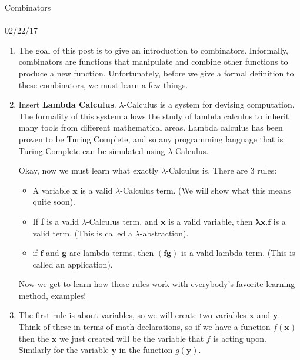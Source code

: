 \documentclass[12pt]{article}
\begin{document}
\begin{center}
{\Large Combinators}\\
\\ %
02/22/17 %
\end{center}

\begin{enumerate}
    \item The goal of this post is to give an introduction to combinators. Informally, combinators are functions that manipulate and combine other functions to produce a new function. Unfortunately, before we give a formal definition to these combinators, we must learn a few things.
    
    \item Insert \textbf{Lambda Calculus}. $\lambda$-Calculus is a system for devising computation. The formality of this system allows the study of lambda calculus to inherit many tools from different mathematical areas. Lambda calculus has been proven to be Turing Complete, and so any programming language that is Turing Complete can be simulated using $\lambda$-Calculus.  
    \par Okay, now we must learn what exactly $\lambda$-Calculus is. There are 3 rules:
    
    \begin{itemize}
  \item A variable $\mathbf{x}$ is a valid $\lambda$-Calculus term. (We will show what this means quite soon).
  
  \item If \textbf{f} is a valid $\lambda$-Calculus term, and $\mathbf{x}$ is a valid variable, then $\boldsymbol{\lambda}\mathbf{x. f}$ is a valid term. (This is called a $\lambda$-abstraction).
  
  \item if $\mathbf{f}$ and  $\mathbf{g}$ are lambda terms, then  $\mathbf{(fg)}$ is a valid lambda term. (This is called an application).
\end{itemize}

Now we get to learn how these rules work with everybody's favorite learning method, examples!
\item The first rule is about variables, so we will create two variables $\mathbf{x}$ and $\mathbf{y}$. Think of these in terms of math declarations, so if we have a function $f(\mathbf{x})$ then the $\mathbf{x}$ we just created will be the variable that $f$ is acting upon. Similarly for the variable $\mathbf{y}$ in the function $g(\mathbf{y})$.


\end{enumerate}
\end{document}
